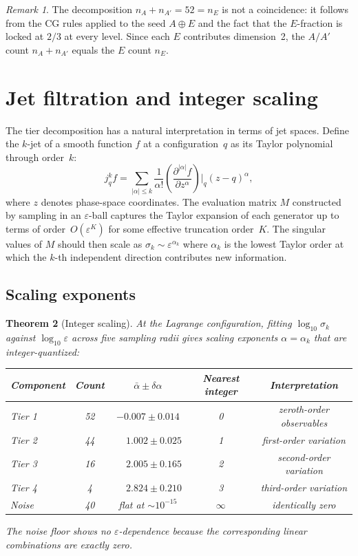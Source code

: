 \documentclass[11pt,a4paper]{article}
\newtheorem{theorem}{Theorem}
\theoremstyle{remark}
\newtheorem{remark}[theorem]{Remark}
\begin{document}
\begin{remark}
The decomposition $n_A + n_{A'} = 52 = n_E$ is not a
coincidence: it follows from the CG rules applied to the
seed $A \oplus E$ and the fact that the $E$-fraction is
locked at $2/3$ at every level.  Since each $E$ contributes
dimension~2, the $A/A'$ count $n_A + n_{A'}$ equals the
$E$ count $n_E$.
\end{remark}


\section{Jet filtration and integer scaling}
\label{sec:jets}

The tier decomposition has a natural interpretation in
terms of jet spaces.  Define the $k$-jet of a smooth
function $f$ at a configuration~$q$ as its Taylor
polynomial through order~$k$:
\[
  j^k_q f = \sum_{|\alpha| \le k}
    \frac{1}{\alpha!}
    \left(\frac{\partial^{|\alpha|} f}
    {\partial z^\alpha}\right)\!\bigg|_q
    (z - q)^\alpha,
\]
where $z$ denotes phase-space coordinates.  The
evaluation matrix $M$ constructed by sampling in an
$\varepsilon$-ball captures the Taylor expansion of each
generator up to terms of order~$O(\varepsilon^K)$ for
some effective truncation order~$K$.  The singular values
of $M$ should then scale as $\sigma_k \sim
\varepsilon^{\alpha_k}$ where $\alpha_k$ is the lowest
Taylor order at which the $k$-th independent direction
contributes new information.

\subsection{Scaling exponents}

\begin{theorem}[Integer scaling]
\label{thm:scaling}
At the Lagrange configuration, fitting $\log_{10}
\sigma_k$ against $\log_{10} \varepsilon$ across five
sampling radii gives scaling exponents
$\alpha = \alpha_k$ that are integer-quantized:
\begin{center}
\begin{tabular}{@{}lcccc@{}}
\toprule
Component & Count & $\bar\alpha \pm \delta\alpha$
  & Nearest integer & Interpretation \\
\midrule
Tier 1 & 52 & $-0.007 \pm 0.014$ & 0
  & zeroth-order observables \\
Tier 2 & 44 & $\phantom{-}1.002 \pm 0.025$ & 1
  & first-order variation \\
Tier 3 & 16 & $\phantom{-}2.005 \pm 0.165$ & 2
  & second-order variation \\
Tier 4 & 4 & $\phantom{-}2.824 \pm 0.210$ & 3
  & third-order variation \\
Noise  & 40 & flat at $\sim\!10^{-15}$
  & $\infty$ & identically zero \\
\bottomrule
\end{tabular}
\end{center}
The noise floor shows no $\varepsilon$-dependence because
the corresponding linear combinations are exactly zero.
\end{theorem}
\end{document}
